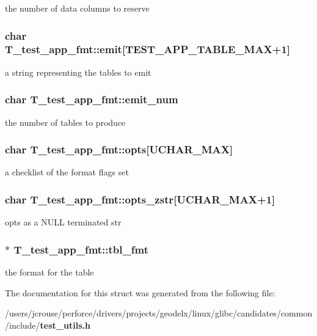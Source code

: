 the number of data columns to reserve 
\subsubsection{\setlength{\rightskip}{0pt plus 5cm}char T\_\-test\_\-app\_\-fmt::emit[TEST\_\-APP\_\-TABLE\_\-MAX+1]}\label{structT__test__app__fmt_m4}


a string representing the tables to emit 
\subsubsection{\setlength{\rightskip}{0pt plus 5cm}char T\_\-test\_\-app\_\-fmt::emit\_\-num}\label{structT__test__app__fmt_m3}


the number of tables to produce 
\subsubsection{\setlength{\rightskip}{0pt plus 5cm}char T\_\-test\_\-app\_\-fmt::opts[UCHAR\_\-MAX]}\label{structT__test__app__fmt_m1}


a checklist of the format flags set 
\subsubsection{\setlength{\rightskip}{0pt plus 5cm}char T\_\-test\_\-app\_\-fmt::opts\_\-zstr[UCHAR\_\-MAX+1]}\label{structT__test__app__fmt_m2}


opts as a NULL terminated str 
\subsubsection{$\ast$ T\_\-test\_\-app\_\-fmt::tbl\_\-fmt}\label{structT__test__app__fmt_m6}


the format for the table 

The documentation for this struct was generated from the following file:\begin{CompactItemize}
\item 
/users/jcrouse/perforce/drivers/projects/geodelx/linux/glibc/candidates/common/include/{\bf test\_\-utils.h}\end{CompactItemize}
